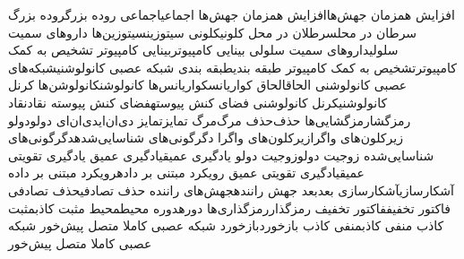 {افزایش همزمان جهش‌ها}{افزایش همزمان جهش‌ها}
{اجماعی}{اجماعی}
{روده بزرگ}{روده بزرگ}
{سرطان در محل}{سرطلان در محل}
{کلونی}{کلونی}
{سیتوزین}{سیتوزین‌ها}
{داروهای سمیت سلولی}{داروهای سمیت سلولی}
{بینایی کامپیوتر}{بینایی کامپیوتر}
{تشخیص به کمک کامپیوتر}{تشخیص به کمک کامپیوتر}
{طبقه بندی}{طبقه بندی}
{شبکه عصبی کانولوشنی}{شبکه‌های عصبی کانولوشنی}
{الحاق}{الحاق}
{کواریانس}{کواریانس‌ها}
{کانولوشن}{کانولوشن‌ها}
{کرنل کانولوشنی}{کرنل کانولوشنی}
{فضای کنش پیوسته}{فضای کنش پیوسته}
{نقاد}{نقاد}
{رمزگشا}{رمزگشایی‌ها}
{‌حذف‌}{‌‌حذف}
{‌مرگ‌}{‌‌مرگ}
{تمایز}{تمایز}
{دی‌ان‌ای}{دی‌ان‌ای}
{دولو}{دولو}
{زیرکلون‌های واگرا}{زیرکلون‌های واگرا}
{دگرگونی‌های شناسایی‌شده}{دگرگونی‌های شناسایی‌‌شده}
{زوجیت دولو}{زوجیت دولو}
{یادگیری عمیق}{یادگیری عمیق}
{یادگیری تقویتی عمیق}{یادگیری تقویتی عمیق}
{رویکرد مبتنی بر داده}{رویکرد مبتنی بر داده}
{آشکارسازی}{آشکارسازی}
{بعد}{بعد}
{جهش راننده}{جهش‌های راننده}
{حذف تصادفی}{حذف تصادفی}
{فاکتور تخفیف}{فاکتور تخفیف}
{رمزگذار}{رمزگذاری‌ها}
{دوره}{دوره}
{محیط}{محیط}
{مثبت کاذب}{مثبت کاذب}
{منفی کاذب}{منفی کاذب}
{بازخورد}{بازخورد}
{شبکه عصبی کاملا متصل پیش‌خور }{شبکه عصبی کاملا متصل پیش‌خور }

